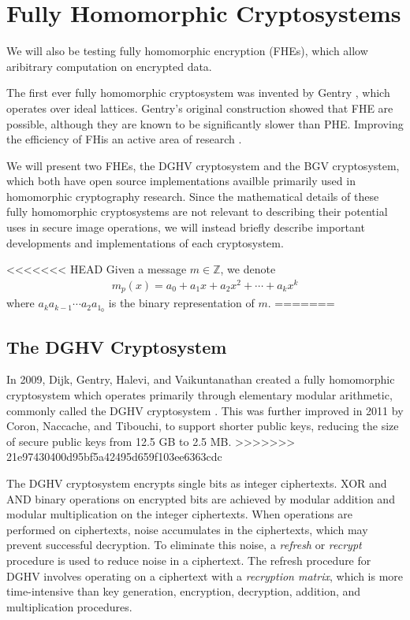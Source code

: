 \section{Fully Homomorphic Cryptosystems}

We will also be testing fully homomorphic encryption (FHEs), which allow aribitrary computation on encrypted data.

The first ever fully homomorphic cryptosystem was invented by Gentry \cite{gentry_fully_2009}, which operates over ideal lattices. Gentry's original construction showed that FHE are possible, although they are known to be significantly slower than PHE. 
Improving the efficiency of FHis an active area of research \cite{sen_homomorphic_2013}. 

We will present two FHEs, the DGHV cryptosystem and the BGV cryptosystem, which both have open source implementations availble primarily used in homomorphic cryptography research. Since the mathematical details of these fully homomorphic cryptosystems are not relevant to describing their potential uses in secure image operations, we will instead briefly describe important developments and implementations of each cryptosystem.

<<<<<<< HEAD
Given a message $m \in \mathbb{Z}$, we denote
\begin{align*}
		m_p(x) = a_0 + a_1x + a_2x^2 + \cdots + a_kx^k
\end{align*}
where $a_k a_{k-1}\cdots a_2a_1_0$ is the binary representation of $m$.
=======
\subsection{The DGHV Cryptosystem}
In 2009, Dijk, Gentry, Halevi, and Vaikuntanathan created a fully homomorphic cryptosystem which operates primarily through elementary modular arithmetic, commonly called the DGHV cryptosystem \cite{cryptoeprint:2009:616}. This was further improved in 2011 by Coron, Naccache, and Tibouchi, \cite{cryptoeprint:2011:277, cryptoeprint:2011:440} to support shorter public keys, reducing the size of secure public keys from 12.5 GB to 2.5 MB. 
>>>>>>> 21e97430400d95bf5a42495d659f103ee6363cdc

The DGHV cryptosystem encrypts single bits as integer ciphertexts. XOR and AND binary operations on encrypted bits are achieved by modular addition and modular multiplication on the integer ciphertexts. When operations are performed on ciphertexts, noise accumulates in the ciphertexts, which may prevent successful decryption. To eliminate this noise, a \textit{refresh} or \textit{recrypt} procedure is used to reduce noise in a ciphertext. The refresh procedure for DGHV involves operating on a ciphertext with a \textit{recryption matrix}, which is more time-intensive than key generation, encryption, decryption, addition, and multiplication procedures.

